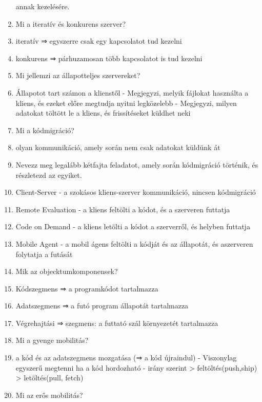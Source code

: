 \documentclass[twoside, a4paper, 12pt]{article}
\begin{document}
\begin{enumerate}
                annak kezelésére. 
            \item  Mi a iteratív és konkurens szerver?
            \item iteratív  ⇒ egyszerre csak egy kapcsolatot tud kezelni
            \item konkurens ⇒ párhuzamosan több kapcsolatot is tud kezelni
            \item  Mi jellemzi az állapotteljes szervereket?
            \item Állapotot tart számon a klienstől
                - Megjegyzi, melyik fájlokat használta a kliens, és ezeket előre megtudja nyitni legközelebb
                - Megjegyzi, milyen adatokat töltött le a kliens, és frissítéseket küldhet neki
            \item  Mi a kódmigráció?
            \item olyan kommunikáció, amely során nem csak adatokat küldünk át
            \item  Nevezz meg legalább kétfajta feladatot, amely során kódmigráció történik, és részletezd az egyiket.
            \item Client-Server
                - a szokásos kliens-szerver kommunikáció, nincsen kódmigráció
            \item Remote Evaluation 
                - a kliens feltölti a kódot, és a szerveren futtatja
            \item Code on Demand 
                - a kliens letölti a kódot a szerverről, és helyben futtatja
            \item Mobile Agent 
                - a mobil ágens feltölti a kódját és az állapotát, és aszerveren folytatja a futását
            \item  Mik az objecktumkomponensek?
            \item Kódszegmens  ⇒ a programkódot tartalmazza
            \item Adatszegmens ⇒ a futó program állapotát tartalmazza
            \item Végrehajtási ⇒ szegmens: a futtató szál környezetét tartalmazza
            \item  Mi a gyenge mobilitás?
            \item a kód és az adatszegmens mozgatása (⇒ a kód újraindul)
                - Viszonylag egyszerű megtenni ha a kód hordozható
                - irány szerint
                > feltöltés(push,ship)
                > letöltés(pull, fetch)
            \item  Mi az erős mobilitás?

\end{enumerate}
\end{document}
